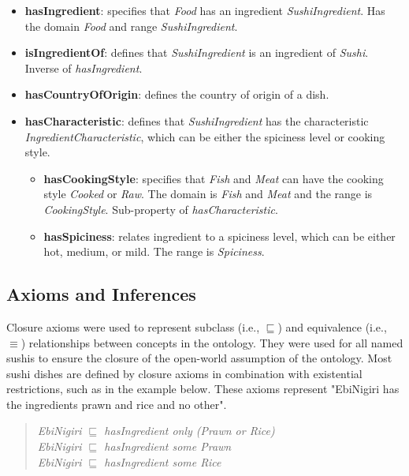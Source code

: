 \documentclass[a4paper]{article}
\theoremstyle{plain}
\theoremstyle{definition}
\begin{document}
        \begin{itemize}
        \item \textbf{hasIngredient}: specifies that \textit{Food} has an ingredient \textit{SushiIngredient}. Has the domain \textit{Food} and range \textit{SushiIngredient}.
        \item \textbf{isIngredientOf}: defines that \textit{SushiIngredient} is an ingredient of \textit{Sushi}. Inverse of \textit{hasIngredient}.
        \item \textbf{hasCountryOfOrigin}: defines the country of origin of a dish.
        \item \textbf{hasCharacteristic}: defines that \textit{SushiIngredient} has the characteristic \textit{IngredientCharacteristic}, which can be either the spiciness level or cooking style.
        \begin{itemize}
            \item \textbf{hasCookingStyle}: specifies that \textit{Fish} and \textit{Meat} can have the cooking style \textit{Cooked} or \textit{Raw}. The domain is \textit{Fish} and \textit{Meat} and the range is \textit{CookingStyle}. Sub-property of \textit{{hasCharacteristic}}.
            \item \textbf{hasSpiciness}: relates ingredient to a spiciness level, which can be either hot, medium, or mild. The range is \textit{Spiciness}.
        \end{itemize}
    \end{itemize}

	\subsection{Axioms and Inferences}
Closure axioms were used to represent subclass (i.e., $\sqsubseteq$) and equivalence (i.e., $\equiv$) relationships between concepts in the ontology. They were used for all named sushis to ensure the closure of the open-world assumption of the ontology. Most sushi dishes are defined by closure axioms in combination with existential restrictions, such as in the example below. These axioms represent "EbiNigiri has the ingredients prawn and rice and no other".\\

\begin{quote}
    \textit{EbiNigiri $\sqsubseteq$ hasIngredient only (Prawn or Rice)}\\
    \textit{EbiNigiri $\sqsubseteq$ hasIngredient some Prawn}\\
    \textit{EbiNigiri $\sqsubseteq$ hasIngredient some Rice} \\
\end{quote}
\end{document}
